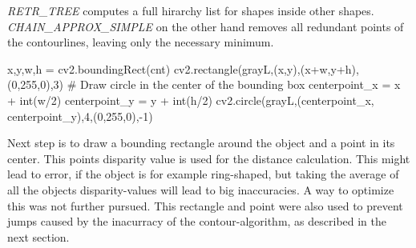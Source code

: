 \documentclass[journal,onecolumn]{IEEEtran}
\begin{document}
\emph{RETR\_TREE} computes a full hirarchy list for shapes inside other shapes. \emph{CHAIN\_APPROX\_SIMPLE} on the other hand removes all redundant points of the contourlines, leaving only the necessary minimum.
\begin{python}
x,y,w,h = cv2.boundingRect(cnt)
cv2.rectangle(grayL,(x,y),(x+w,y+h),(0,255,0),3)
# Draw circle in the center of the bounding box
centerpoint_x = x + int(w/2)
centerpoint_y = y + int(h/2)
cv2.circle(grayL,(centerpoint_x, centerpoint_y),4,(0,255,0),-1)
\end{python}
\noindent Next step is to draw a bounding rectangle around the object and a point in its center. This points disparity value is used for the distance calculation. This might lead to error, if the object is for example ring-shaped, but taking the average of all the objects disparity-values will lead to big inaccuracies. A way to optimize this was not further pursued. \newline
This rectangle and point were also used to prevent jumps caused by the inacurracy of the contour-algorithm, as described in the next section.
\end{document}
